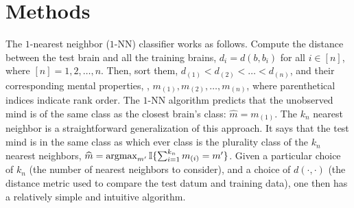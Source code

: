 \documentclass{article}
\newcommand{\II}{\mathbb{I}}           %
\providecommand{\mc}[1]{\mathcal{#1}}
\providecommand{\mh}[1]{\widehat{#1}}
\newcommand{\argmax}{\operatornamewithlimits{argmax}}
\begin{document}


\section*{Methods}
\label{sec:methods}




The $1$-nearest neighbor ($1$-NN) classifier works as follows.  Compute the distance between the test brain and all the training brains, $d_i=d(b,b_i)$ for all $i \in [n]$, where $[n]=1,2,\ldots, n$.  Then, sort them, $d_{(1)} < d_{(2)} < \ldots < d_{(n)}$, and their corresponding mental properties, , $m_{(1)}, m_{(2)}, \ldots, m_{(n)}$, where parenthetical indices indicate rank order.  %
The $1$-NN algorithm predicts that the unobserved mind is of the same class as the closest brain's class: $\mh{m}=m_{(1)}$.  The $k_n$ nearest neighbor is a straightforward generalization of this approach.  It says that the test mind is in the same class as which ever class is the plurality class of the $k_n$ nearest neighbors, $\mh{m}=\argmax_{m'}\II\{\sum_{i=1}^{k_n} m_{(i)}=m'\}$.  Given a particular choice of $k_n$ (the number of nearest neighbors to consider), and a choice of $d(\cdot,\cdot)$ (the distance metric used to compare the test datum and training data), one then has a relatively simple and intuitive algorithm.  
\end{document}
